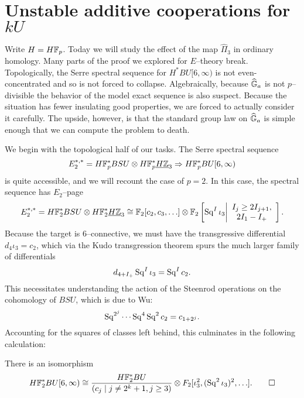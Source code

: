 \section{Unstable additive cooperations for $kU$}

Write $H = H\mathbb F_p$.  Today we will study the effect of the map $\hat \Pi_3$ in ordinary homology.  Many parts of the proof we explored for $E$--theory break.  Topologically, the Serre spectral sequence for $H^* BU[6, \infty)$ is not even-concentrated and so is not forced to collapse.  Algebraically, because $\widehat{\mathbb G}_a$ is not $p$--divisible the behavior of the model exact sequence is also suspect.  Because the situation has fewer insulating good properties, we are forced to actually consider it carefully.  The upside, however, is that the standard group law on $\widehat{\mathbb G}_a$ is simple enough that we can compute the problem to death.

We begin with the topological half of our tasks.  The Serre spectral sequence \[E_2^{*, *} = H\mathbb F_p^* BSU \otimes H\mathbb F_p^* \underline{\smash{H\mathbb Z}}_{3} \Rightarrow H\mathbb F_p^* BU[6, \infty)\] is quite accessible, and we will recount the case of $p = 2$.  In this case, the spectral sequence has $E_2$--page \[E_2^{*, *} = H\mathbb F_2^* BSU \otimes H\mathbb F_2^* \underline{\smash{H\mathbb Z}}_{3} \cong \mathbb F_2[c_2, c_3, \ldots] \otimes \mathbb F_2\left[\operatorname{Sq}^I \iota_3 \middle| \begin{array}{c} I_j \ge 2I_{j+1}, \\ 2 I_1 - I_+ \end{array}\right].\]   Because the target is $6$--connective, we must have the transgressive differential $d_4 \iota_3 = c_2$, which via the Kudo transgression theorem spurs the much larger family of differentials \[d_{4+I_+} \operatorname{Sq}^I \iota_3 = \operatorname{Sq}^I c_2.\]  This necessitates understanding the action of the Steenrod operations on the cohomology of $BSU$, which is due to Wu: \[\operatorname{Sq}^{2^j} \cdots \operatorname{Sq}^4 \operatorname{Sq}^2 c_2 = c_{1 + 2^j}.\]  Accounting for the squares of classes left behind, this culminates in the following calculation:

\begin{theorem}\label{HF2BU6Calculation}
There is an isomorphism \[H\mathbb F_2^* BU[6, \infty) \cong \frac{H\mathbb F_2^* BU}{(c_j \mid j \ne 2^k + 1, j \ge 3)} \otimes F_2[\iota_3^2, (\operatorname{Sq}^2 \iota_3)^2, \ldots]. \qed\]
\end{theorem}

